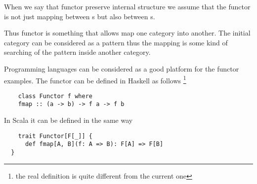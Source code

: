 \begin{remark}[Functor]
  When we say that functor preserve internal structure we assume that
  the functor is not just mapping between s but
  also between s.  

  Thus functor is something that allows map one category into another.
  The initial category can be considered as a pattern thus the mapping
  is some kind of searching of the pattern inside another category.
\end{remark}

Programming languages can be considered as a good platform for the
functor examples. 
The functor can be defined in Haskell as follows
\footnote{the real definition is quite different from the current one}
\begin{example}
  \label{ex:functor_haskell}
  \begin{verbatim}
    class Functor f where
    fmap :: (a -> b) -> f a -> f b
  \end{verbatim} 
\end{example}

In Scala it can be defined in the same way
\begin{example}
  \label{ex:functor_scala}
  \begin{verbatim}
    trait Functor[F[_]] {
      def fmap[A, B](f: A => B): F[A] => F[B]
  }\end{verbatim} 
\end{example}

